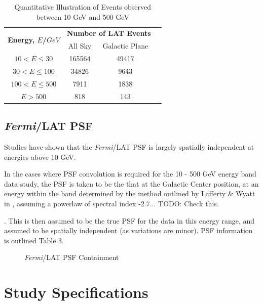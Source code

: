 \documentclass{PoS}
\begin{document}
\begin{table}
\centering
\begin{tabular}{|c|c|c|c|}
\hline
\multirow{2}{*}{\textbf{Energy, $E$/$GeV$}} & \multicolumn{2}{|c|}{\textbf{Number of LAT Events}}\\
 & All Sky & Galactic Plane \\\hline
$10 < E \leq 30$ & 165564 & 49417 \\\hline
$30 < E \leq 100$ & 34826 & 9643 \\\hline
$100 < E \leq 500$ & 7911 & 1838 \\\hline
$ E > 500$ & 818 & 143 \\\hline
\end{tabular}
\caption{Quantitative Illustration of Events observed between 10 GeV and 500 GeV}
\end{table}

\subsection{\textit{Fermi}/LAT PSF}


Studies have shown that the \textit{Fermi}/LAT PSF is largely spatially independent at energies above 10 GeV.


In the cases where PSF convolution is required for the 10 - 500 GeV energy band data study, the PSF is taken to be the that at the Galactic Center position, at an energy within the band determined by the method outlined by Lafferty \& Wyatt in %
, assuming a powerlaw of spectral index -2.7... TODO: Check this.

. This is then assumed to be the true PSF for the data in this energy range, and assumed to be spatially independent (as variations are minor). PSF information is outlined Table 3.


\begin{figure}
\centering
{}
\caption{\textit{Fermi}/LAT PSF Containment}
\end{figure}


\section{Study Specifications}
\end{document}
